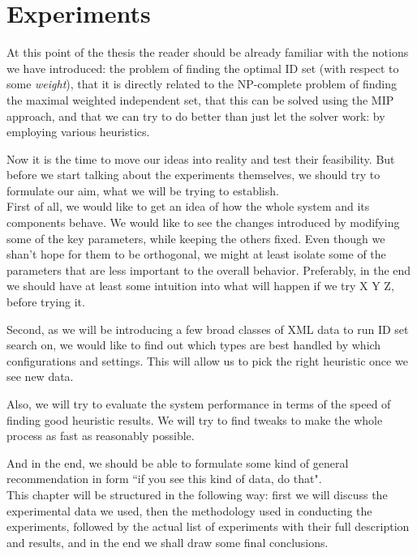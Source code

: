 \chapter{Experiments}

At this point of the thesis the reader should be already familiar with the notions we have introduced: the problem of finding the optimal ID set (with respect to some \textit{weight}), that it is directly related to the NP-complete problem of finding the maximal weighted independent set, that this can be solved using the MIP approach, and that we can try to do better than just let the solver work: by employing various heuristics.

Now it is the time to move our ideas into reality and test their feasibility. But before we start talking about the experiments themselves, we should try to formulate our aim, what we will be trying to establish.\\

First of all, we would like to get an idea of how the whole system and its components behave. We would like to see the changes introduced by modifying some of the key parameters, while keeping the others fixed. Even though we shan't hope for them to be orthogonal, we might at least isolate some of the parameters that are less important to the overall behavior. Preferably, in the end we should have at least some intuition into what will happen if we try X Y Z, before trying it.

Second, as we will be introducing a few broad classes of XML data to run ID set search on, we would like to find out which types are best handled by which configurations and settings. This will allow us to pick the right heuristic once we see new data.

Also, we will try to evaluate the system performance in terms of the speed of finding good heuristic results. We will try to find tweaks to make the whole process as fast as reasonably possible.

And in the end, we should be able to formulate some kind of general recommendation in form ``if you see this kind of data, do that".\\

This chapter will be structured in the following way: first we will discuss the experimental data we used, then the methodology used in conducting the experiments, followed by the actual list of experiments with their full description and results, and in the end we shall draw some final conclusions.

